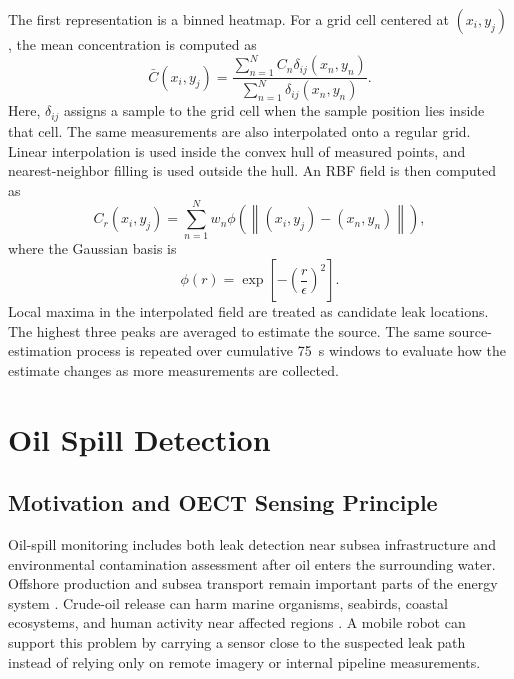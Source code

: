 \documentclass{uhcoethesis}
\begin{document}
The first representation is a binned heatmap. For a grid cell centered at $(x_i,y_j)$, the mean concentration is computed as
\begin{equation}
    \bar{C}(x_i,y_j) = \frac{\sum_{n=1}^{N} C_n \delta_{ij}(x_n,y_n)}{\sum_{n=1}^{N} \delta_{ij}(x_n,y_n)}.
    \label{eq:ch4_co2_binned_heatmap}
\end{equation}
Here, $\delta_{ij}$ assigns a sample to the grid cell when the sample position lies inside that cell. The same measurements are also interpolated onto a regular grid. Linear interpolation is used inside the convex hull of measured points, and nearest-neighbor filling is used outside the hull. An RBF field is then computed as
\begin{equation}
    C_r(x_i,y_j) = \sum_{n=1}^{N} w_n \phi\left(\left\|(x_i,y_j)-(x_n,y_n)\right\|\right),
    \label{eq:ch4_co2_rbf}
\end{equation}
where the Gaussian basis is
\begin{equation}
    \phi(r) = \exp\left[-\left(\frac{r}{\epsilon}\right)^2\right].
    \label{eq:ch4_co2_gaussian_rbf}
\end{equation}
Local maxima in the interpolated field are treated as candidate leak locations. The highest three peaks are averaged to estimate the source. The same source-estimation process is repeated over cumulative 75~s windows to evaluate how the estimate changes as more measurements are collected.

\section{Oil Spill Detection}

\subsection{Motivation and OECT Sensing Principle}

Oil-spill monitoring includes both leak detection near subsea infrastructure and environmental contamination assessment after oil enters the surrounding water. Offshore production and subsea transport remain important parts of the energy system \cite{HeinrichBoellStiftung2017}. Crude-oil release can harm marine organisms, seabirds, coastal ecosystems, and human activity near affected regions \cite{Almeda2014,Albers1982}. A mobile robot can support this problem by carrying a sensor close to the suspected leak path instead of relying only on remote imagery or internal pipeline measurements.
\end{document}
